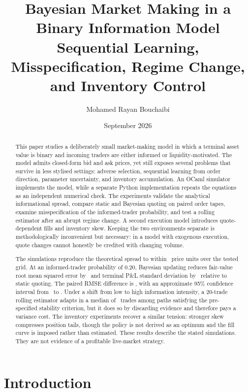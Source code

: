 \documentclass[11pt]{article}
\title{Bayesian Market Making in a Binary Information Model\\
\large Sequential Learning, Misspecification, Regime Change, and Inventory Control}
\author{Mohamed Rayan Bouchaibi}
\date{September 2026}
\begin{document}
\maketitle

\begin{abstract}
This paper studies a deliberately small market-making model in which a terminal asset value is binary and incoming traders are either informed or liquidity-motivated. The model admits closed-form bid and ask prices, yet still exposes several problems that survive in less stylised settings: adverse selection, sequential learning from order direction, parameter uncertainty, and inventory accumulation. An OCaml simulator implements the model, while a separate Python implementation repeats the equations as an independent numerical check. The experiments validate the analytical informational spread, compare static and Bayesian quoting on paired order tapes, examine misspecification of the informed-trader probability, and test a rolling estimator after an abrupt regime change. A second execution model introduces quote-dependent fills and inventory skew. Keeping the two environments separate is methodologically inconvenient but necessary: in a model with exogenous execution, quote changes cannot honestly be credited with changing volume.

The simulations reproduce the theoretical spread to within \SpreadMaxError\ price units over the tested grid. At an informed-trader probability of $0.20$, Bayesian updating reduces fair-value root mean squared error by \RmseDropAtTwenty\ and terminal P\&L standard deviation by \PnlSdDropAtTwenty\ relative to static quoting. The paired RMSE difference is \PairedRmseDeltaTwenty, with an approximate 95\% confidence interval from \PairedRmseCiLow\ to \PairedRmseCiHigh. Under a shift from low to high information intensity, a 20-trade rolling estimator adapts in a median of \RollingMedianDelay\ trades among paths satisfying the pre-specified stability criterion, but it does so by discarding evidence and therefore pays a variance cost. The inventory experiments recover a similar tension: stronger skew compresses position tails, though the policy is not derived as an optimum and the fill curve is imposed rather than estimated. These results describe the stated simulations. They are not evidence of a profitable live-market strategy.
\end{abstract}

\section{Introduction}
\end{document}
